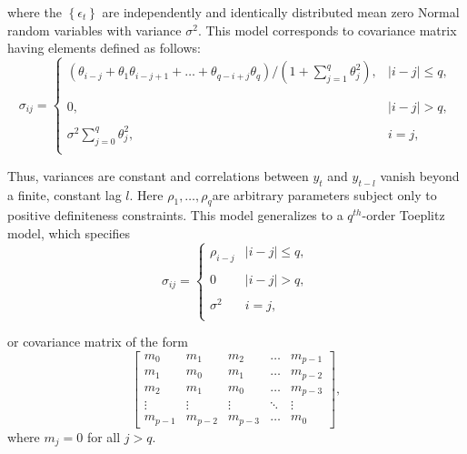 \noindent
where the $\left\{\epsilon_t\right\}$ are independently and identically distributed mean zero Normal random variables with variance $\sigma^2$. This model corresponds to covariance matrix having elements defined as follows:
\begin{equation*}
\sigma_{ij} = \left\{ \begin{array}{ll}
\left(\theta_{i-j} + \theta_{1}\theta_{i-j +1} + \dots + \theta_{q-i+j}\theta_{q}\right)/\left(1 + \sum_{j = 1}^q \theta_j^2\right), & \vert i-j\vert \le q,\\ 
& \\
& \\
0, &  \vert i-j\vert > q, \\
& \\
\sigma^2 \sum\limits_{j = 0}^q \theta_j^2, & i = j,\\
\end{array}\right.
\end{equation*}


\noindent
Thus, variances are constant and correlations between $y_t$ and $y_{t-l}$ vanish beyond a finite, constant lag $l$. Here $\rho_1,\dots, \rho_q$are arbitrary parameters subject only to positive definiteness constraints. This model generalizes to a $q^{th}$-order Toeplitz model, which specifies
\begin{equation} \label{eq:toeplitz-covariance-model}
\sigma_{ij} = \left\{ \begin{array}{ll}
\rho_{i-j} & \vert i - j \vert\le q, \\ 
&\\
0 & \vert i - j \vert >  q, \\ 
& \\
\sigma^2  & i = j,\\
\end{array}\right.
\end{equation}

\noindent
or covariance matrix of the form
\begin{equation} \label{eq:toeplitz-covariance-matrix}
\begin{bmatrix} m_0 & m_1 & m_2 & \dots & m_{p-1}\\ m_1 & m_0 & m_1 & \dots & m_{p-2}\\m_2 & m_1 & m_0 & \dots & m_{p-3}\\ \vdots & \vdots & \vdots & \ddots & \vdots\\  m_{p-1} & m_{p-2} & m_{p-3} & \dots & m_0 \end{bmatrix}, 
\end{equation}
\noindent
where $m_j = 0$ for all $j > q$.


